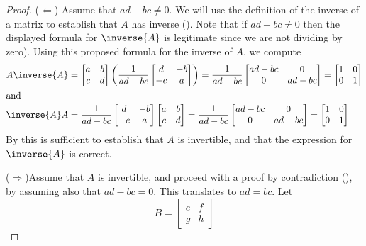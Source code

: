 %
\begin{proof}
%
($\Leftarrow$) Assume that $ad-bc\neq 0$.  We will use the definition of the inverse of a matrix to establish that $A$ has inverse ().  Note that if $ad-bc\neq 0$ then the displayed formula for $\inverse{A}$ is legitimate since we are not dividing by zero).  Using this proposed formula for the inverse of $A$, we compute
%
\begin{align*}
A\inverse{A}
&=
\begin{bmatrix}a&b\\c&d\end{bmatrix}
\left(\frac{1}{ad-bc}
\begin{bmatrix}d&-b\\-c&a\end{bmatrix}
\right)
=
\frac{1}{ad-bc}
\begin{bmatrix}ad-bc&0\\0&ad-bc\end{bmatrix}
=
\begin{bmatrix}1&0\\0&1\end{bmatrix}\\
%
\intertext{and}
%
\inverse{A}A
&=
\frac{1}{ad-bc}
\begin{bmatrix}d&-b\\-c&a\end{bmatrix}
\begin{bmatrix}a&b\\c&d\end{bmatrix}
%
=
\frac{1}{ad-bc}
\begin{bmatrix}ad-bc&0\\0&ad-bc\end{bmatrix}
=
\begin{bmatrix}1&0\\0&1\end{bmatrix}
\end{align*}
%
By  this is sufficient to establish that $A$ is invertible, and that the expression for $\inverse{A}$ is correct.\par
%
($\Rightarrow$)\quad Assume that $A$ is invertible, and proceed with a proof by contradiction (), by assuming also that $ad-bc=0$.  This translates to $ad=bc$.  Let
%
\begin{equation*}
B=
\begin{bmatrix}
e&f\\
g&h
\end{bmatrix}
\end{equation*}

\end{proof}
